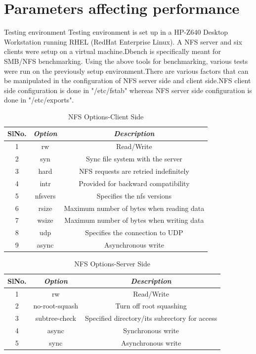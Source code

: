 \documentclass[conference]{IEEEtran}
\begin{document}
\section{Parameters affecting performance}
Testing environment
Testing environment is set up in a HP-Z640 Desktop Workstation running RHEL 
(RedHat Enterprise Linux). A NFS server and six clients were setup on a 
virtual machine.Dbench is specifically meant for SMB/NFS benchmarking.
Using the above tools for benchmarking, various tests were run on the 
previously setup environment.There are various factors that can be manipulated 
in the configuration of NFS server side and client side.NFS client side 
configuration is done in "/etc/fstab" whereas NFS server side configuration is 
done in "/etc/exports".
\begin{table}[htbp]
\caption{NFS Options-Client Side}
\begin{center}
\begin{tabular}{|c|c|c|}
\hline
\cline{2-3} 
\textbf{SlNo.} & \textbf{\textit{Option}}& \textbf{\textit{Description}} \\
\hline
1& rw & Read/Write  \\
2& syn & Sync file system with the server  \\
3& hard & NFS requests are retried indefinitely  \\
4& intr & Provided for backward compatibility \\
5& nfsvers & Specifies the nfs versions  \\
6& rsize & Maximum number of bytes when reading data  \\
7& wsize & Maximum number of bytes when writing data  \\
8& udp & Specifies the connection to UDP  \\
9& async & Asynchronous write  \\
\hline
\end{tabular}
\label{tab2}
\end{center}
\end{table}
\begin{table}[htbp]
\caption{NFS Options-Server Side}
\begin{center}
\begin{tabular}{|c|c|c|}
\hline
\cline{2-3} 
\textbf{SlNo.} & \textbf{\textit{Option}}& \textbf{\textit{Description}} \\
\hline
1& rw & Read/Write  \\
2& no-root-squash & Turn off root squashing  \\
3& subtree-check & Specified directory/its subrectory for access  \\
4& async & Synchronous write \\
5& sync & Asynchronous write  \\
\hline
\end{tabular}
\label{tab1}
\end{center}
\end{table}
\end{document}

